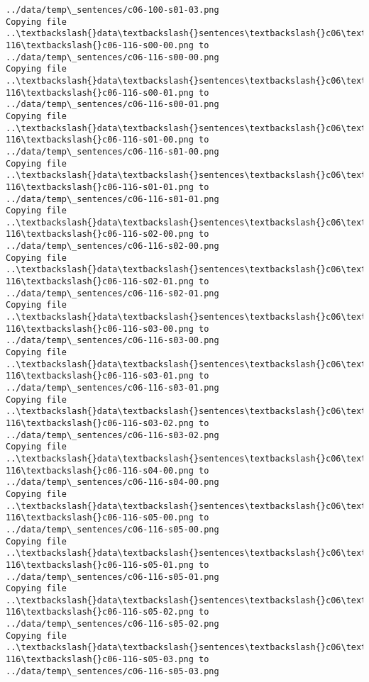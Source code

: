 \documentclass[11pt]{article}
\begin{document}
\begin{Verbatim}[commandchars=\\\{\}]
../data/temp\_sentences/c06-100-s01-03.png
Copying file ..\textbackslash{}data\textbackslash{}sentences\textbackslash{}c06\textbackslash{}c06-116\textbackslash{}c06-116-s00-00.png to
../data/temp\_sentences/c06-116-s00-00.png
Copying file ..\textbackslash{}data\textbackslash{}sentences\textbackslash{}c06\textbackslash{}c06-116\textbackslash{}c06-116-s00-01.png to
../data/temp\_sentences/c06-116-s00-01.png
Copying file ..\textbackslash{}data\textbackslash{}sentences\textbackslash{}c06\textbackslash{}c06-116\textbackslash{}c06-116-s01-00.png to
../data/temp\_sentences/c06-116-s01-00.png
Copying file ..\textbackslash{}data\textbackslash{}sentences\textbackslash{}c06\textbackslash{}c06-116\textbackslash{}c06-116-s01-01.png to
../data/temp\_sentences/c06-116-s01-01.png
Copying file ..\textbackslash{}data\textbackslash{}sentences\textbackslash{}c06\textbackslash{}c06-116\textbackslash{}c06-116-s02-00.png to
../data/temp\_sentences/c06-116-s02-00.png
Copying file ..\textbackslash{}data\textbackslash{}sentences\textbackslash{}c06\textbackslash{}c06-116\textbackslash{}c06-116-s02-01.png to
../data/temp\_sentences/c06-116-s02-01.png
Copying file ..\textbackslash{}data\textbackslash{}sentences\textbackslash{}c06\textbackslash{}c06-116\textbackslash{}c06-116-s03-00.png to
../data/temp\_sentences/c06-116-s03-00.png
Copying file ..\textbackslash{}data\textbackslash{}sentences\textbackslash{}c06\textbackslash{}c06-116\textbackslash{}c06-116-s03-01.png to
../data/temp\_sentences/c06-116-s03-01.png
Copying file ..\textbackslash{}data\textbackslash{}sentences\textbackslash{}c06\textbackslash{}c06-116\textbackslash{}c06-116-s03-02.png to
../data/temp\_sentences/c06-116-s03-02.png
Copying file ..\textbackslash{}data\textbackslash{}sentences\textbackslash{}c06\textbackslash{}c06-116\textbackslash{}c06-116-s04-00.png to
../data/temp\_sentences/c06-116-s04-00.png
Copying file ..\textbackslash{}data\textbackslash{}sentences\textbackslash{}c06\textbackslash{}c06-116\textbackslash{}c06-116-s05-00.png to
../data/temp\_sentences/c06-116-s05-00.png
Copying file ..\textbackslash{}data\textbackslash{}sentences\textbackslash{}c06\textbackslash{}c06-116\textbackslash{}c06-116-s05-01.png to
../data/temp\_sentences/c06-116-s05-01.png
Copying file ..\textbackslash{}data\textbackslash{}sentences\textbackslash{}c06\textbackslash{}c06-116\textbackslash{}c06-116-s05-02.png to
../data/temp\_sentences/c06-116-s05-02.png
Copying file ..\textbackslash{}data\textbackslash{}sentences\textbackslash{}c06\textbackslash{}c06-116\textbackslash{}c06-116-s05-03.png to
../data/temp\_sentences/c06-116-s05-03.png

\end{Verbatim}
\end{document}
